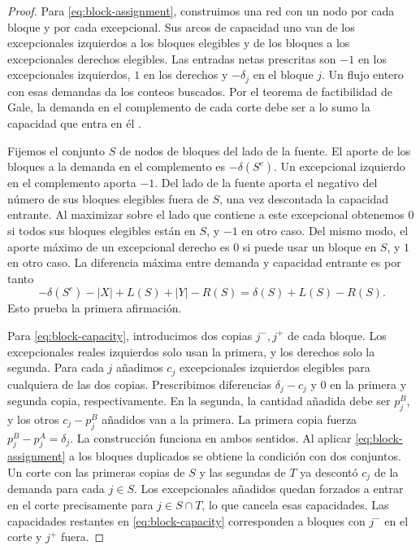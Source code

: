 \begin{proof}
Para \eqref{eq:block-assignment}, construimos una red con un nodo por cada bloque y por cada excepcional. Sus arcos de capacidad uno van de los excepcionales izquierdos a los bloques elegibles y de los bloques a los excepcionales derechos elegibles. Las entradas netas prescritas son \(-1\) en los excepcionales izquierdos, \(1\) en los derechos y \(-\delta_j\) en el bloque \(j\). Un flujo entero con esas demandas da los conteos buscados. Por el teorema de factibilidad de Gale, la demanda en el complemento de cada corte debe ser a lo sumo la capacidad que entra en él \cite{Gale}.

Fijemos el conjunto \(S\) de nodos de bloques del lado de la fuente. El aporte de los bloques a la demanda en el complemento es \(-\delta(S^c)\). Un excepcional izquierdo en el complemento aporta \(-1\). Del lado de la fuente aporta el negativo del número de sus bloques elegibles fuera de \(S\), una vez descontada la capacidad entrante. Al maximizar sobre el lado que contiene a este excepcional obtenemos \(0\) si todos sus bloques elegibles están en \(S\), y \(-1\) en otro caso. Del mismo modo, el aporte máximo de un excepcional derecho es \(0\) si puede usar un bloque en \(S\), y \(1\) en otro caso. La diferencia máxima entre demanda y capacidad entrante es por tanto
\[
 -\delta(S^c)-|X|+L(S)+|Y|-R(S)
 =\delta(S)+L(S)-R(S).
\]
Esto prueba la primera afirmación.

Para \eqref{eq:block-capacity}, introducimos dos copias \(j^-,j^+\) de cada bloque. Los excepcionales reales izquierdos solo usan la primera, y los derechos solo la segunda. Para cada \(j\) añadimos \(c_j\) excepcionales izquierdos elegibles para cualquiera de las dos copias. Prescribimos diferencias \(\delta_j-c_j\) y \(0\) en la primera y segunda copia, respectivamente. En la segunda, la cantidad añadida debe ser \(p^B_j\), y los otros \(c_j-p^B_j\) añadidos van a la primera. La primera copia fuerza \(p^B_j-p^A_j=\delta_j\). La construcción funciona en ambos sentidos. Al aplicar \eqref{eq:block-assignment} a los bloques duplicados se obtiene la condición con dos conjuntos. Un corte con las primeras copias de \(S\) y las segundas de \(T\) ya descontó \(c_j\) de la demanda para cada \(j\in S\). Los excepcionales añadidos quedan forzados a entrar en el corte precisamente para \(j\in S\cap T\), lo que cancela esas capacidades. Las capacidades restantes en \eqref{eq:block-capacity} corresponden a bloques con \(j^-\) en el corte y \(j^+\) fuera.
\end{proof}

